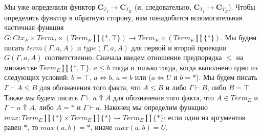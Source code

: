 \documentclass{amsart}
\theoremstyle{definition}
\theoremstyle{remark}
\newcommand{\deq}{\Leftrightarrow}
\newcommand{\cat}[1]{\mathbf{#1}}
\renewcommand{\C}{\cat{C}}
\numberwithin{figure}{section}
\begin{document}
Мы уже определили функтор $\C_{T_I} \to \C_{T_E}$ (и, следовательно, $\C_{T_I} \to \C_{T_B}$).
Чтобы определить функтор в обратную сторону, нам понадобится вспомогательная частичная функция $G : Ctx_E \times Term_I \times (Term_E \amalg \{ *, \top \}) \to Term_E \times (Term_E \amalg \{ * \})$.
Мы будем писать $term(\Gamma, a, A)$ и $type(\Gamma, a, A)$ для первой и второй проекции $G(\Gamma, a, A)$ соответственно.
Сначала введем отношение предпорядка $\leq$ на множестве $Term_E \amalg \{ *, \top \}$. $a \leq b$ тогда и только тогда, когда выполнено одно из следующих условий: $b = \top$, $a \deq b$, $a = b$ или ($a \deq U$ и $b = *$).
Мы будем писать $\Gamma \vdash A \leq B$ для обозначения того факта, что $A \leq B$ и либо $\Gamma \vdash B$, либо $B = \top$.
Также мы будем писать $\Gamma \vdash a \Uparrow A$ для обозначения того факта, что $A \in Term_E$ и $\Gamma \vdash a \Uparrow A$, либо $A = *$ и $\Gamma \vdash a$.
Наконец мы определим функцию $max : Term_E \amalg \{ * \} \times Term_E \amalg \{ * \} \to Term_E \amalg \{ * \}$: если один из аргументов равен $*$, то $max(a, b) = *$, иначе $max(a, b) = U$.
\end{document}
